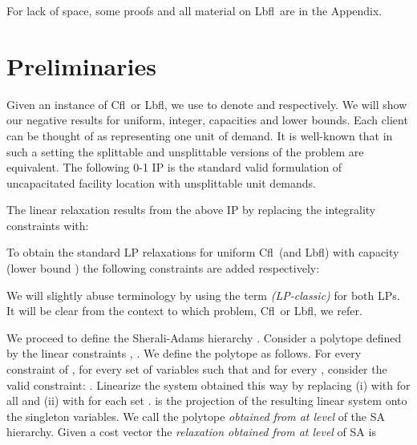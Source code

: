 \documentclass[11pt]{article}
\newcommand{\lbfl}{{\sc Lbfl}}
\newcommand{\cfl}{{\sc Cfl}}
\begin{document}
\iffalse 
Our three  results  and their proofs seem additionally to suggest 
 that a bounded-gap relaxation should  not  constrain  the number of variables
 appearing in each  inequality. 
Whether such  non-trivial inequalities,   with large support and an
efficient separation oracle, exist is an open question. 
\fi 

For lack of space, some proofs and all material on \lbfl\ are
 in the Appendix. 







\section{Preliminaries}
\label{sec:prel}


Given an instance  of \cfl\ or \lbfl, we use  to denote  and 
respectively.
We will show our negative results for uniform, integer, capacities and lower
bounds. Each client can be thought of as representing one unit of demand.
 It  is  well-known  that in such a setting  the  splittable  and
unsplittable versions  of the problem are equivalent. 
The following 0-1  IP is the standard  valid formulation of uncapacitated 
facility location with unsplittable unit demands.

\vspace*{-0.35cm}

\vspace*{-0.2cm}

\iffalse 

\fi 

\noindent 
The linear relaxation results  from the above IP by replacing the integrality constraints
 with: 
   
To obtain the standard LP relaxations for 
uniform \cfl\ (and \lbfl) with capacity  (lower bound )
the following constraints are added
respectively: 


\vspace*{-0.2cm}



We will slightly abuse terminology by 
using  the term {\em (LP-classic)} for both LPs. It will be clear from the context to
which problem, \cfl\ or \lbfl,  we refer. 


We proceed to define the Sherali-Adams hierarchy \cite{SheraliA90}. 
Consider a polytope  defined by the linear
constraints 
, . We define the polytope 
 as follows. For every constraint 
of , for every set of variables  such that
 and for every , consider the valid constraint:
.
Linearize the system obtained this way by replacing (i)  with
 for all  and (ii) 
with   for each set . 
is the projection of the resulting linear system onto the singleton
variables. We call  the polytope {\em obtained from  
at level } of the SA
hierarchy. Given a cost vector  the {\em relaxation
obtained from  at level } of SA is  
\end{document}
